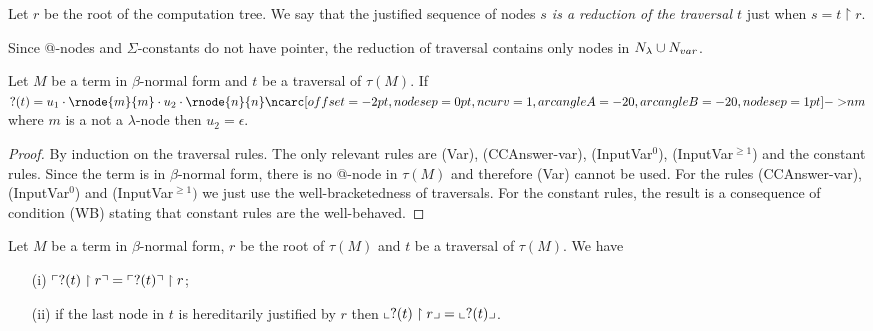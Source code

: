 \begin{dfn}
Let $r$ be the root of the computation tree. We say that the
justified sequence of nodes \emph{$s$ is a reduction of the
traversal $t$} just when $s = t \upharpoonright r$.
\end{dfn}

Since @-nodes and $\Sigma$-constants do not have pointer, the
reduction of traversal contains only nodes in $N_\lambda \cup
N_{var}$.


\begin{lem}
\label{lem:var_followedby_child} Let $M$ be a term in $\beta$-normal
form and $t$ be a traversal of $\tau(M)$. If $?(t) = u_1 \cdot
\rnode{m}{m} \cdot u_2 \cdot \rnode{n}{n}
\bkptr[nodesep=1pt]{20}{n}{m}$ where $m$ is a not a $\lambda$-node
then $u_2 = \epsilon$.
\end{lem}
\begin{proof}
By induction on the traversal rules. The only relevant rules are (Var), (CCAnswer-var), (InputVar$^0$), (InputVar$^{\geq 1}$)
and the constant rules.
Since the term is in $\beta$-normal form, there is no @-node in $\tau(M)$ and therefore (Var) cannot be used.
For the rules (CCAnswer-var), (InputVar$^0$) and (InputVar$^{\geq 1})$ we just use the well-bracketedness of traversals.
For the constant rules, the result is a consequence of condition (WB) stating that constant rules are the well-behaved.
\end{proof}

\begin{lem}
\label{lem:redtrav_trav} Let $M$ be a term in $\beta$-normal form,
$r$ be the root of $\tau(M)$ and $t$ be a traversal of $\tau(M)$. We
have
\begin{itemize}
\item[(i)] $ \ulcorner ?(t) \upharpoonright  r  \urcorner = \ulcorner ?(t) \urcorner \upharpoonright r$;
\item[(ii)] if the last node in $t$ is hereditarily justified by $r$ then $ \llcorner ?(t) \upharpoonright r  \lrcorner = \llcorner ?(t) \lrcorner$.
\end{itemize}
\end{lem}

